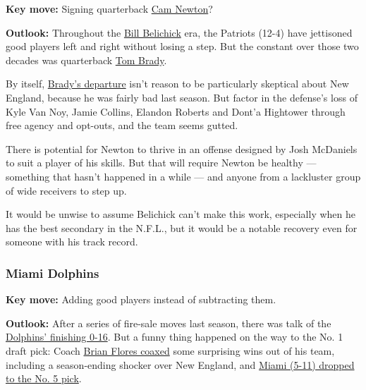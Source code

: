 \textbf{Key move:} Signing quarterback
\href{https://www.nytimes3xbfgragh.onion/2020/07/06/sports/football/cam-newton-new-england-patriots.html}{Cam
Newton}?

\textbf{Outlook:} Throughout the
\href{https://www.nytimes3xbfgragh.onion/2020/06/29/sports/football/cam-newton-patriots-deal.html}{Bill
Belichick} era, the Patriots (12-4) have jettisoned good players left
and right without losing a step. But the constant over those two decades
was quarterback
\href{https://www.nytimes3xbfgragh.onion/2020/09/09/sports/football/tom-brady-tampa-bay-buccaneers.html}{Tom
Brady}.

By itself,
\href{https://www.nytimes3xbfgragh.onion/2020/03/19/sports/football/tom-brady-boston-patriot-fans.html}{Brady's
departure} isn't reason to be particularly skeptical about New England,
because he was fairly bad last season. But factor in the defense's loss
of Kyle Van Noy, Jamie Collins, Elandon Roberts and Dont'a Hightower
through free agency and opt-outs, and the team seems gutted.

There is potential for Newton to thrive in an offense designed by Josh
McDaniels to suit a player of his skills. But that will require Newton
be healthy --- something that hasn't happened in a while --- and anyone
from a lackluster group of wide receivers to step up.

It would be unwise to assume Belichick can't make this work, especially
when he has the best secondary in the N.F.L., but it would be a notable
recovery even for someone with his track record.

\hypertarget{miami-dolphins}{%
\subsubsection{\texorpdfstring{\textbf{Miami
Dolphins}}{Miami Dolphins}}\label{miami-dolphins}}

\textbf{Key move:} Adding good players instead of subtracting them.

\textbf{Outlook:} After a series of fire-sale moves last season, there
was talk of the
\href{https://www.nytimes3xbfgragh.onion/2019/10/29/sports/football/miami-dolphins-bad-worst.html}{Dolphins'
finishing 0-16}. But a funny thing happened on the way to the No. 1
draft pick: Coach
\href{https://www.nytimes3xbfgragh.onion/2019/09/19/sports/football/brian-flores-dolphins.html}{Brian
Flores coaxed} some surprising wins out of his team, including a
season-ending shocker over New England, and
\href{https://www.nytimes3xbfgragh.onion/2020/04/24/sports/football/nfl-draft-first-round-patriots.html}{Miami
(5-11) dropped to the No. 5 pick}.

